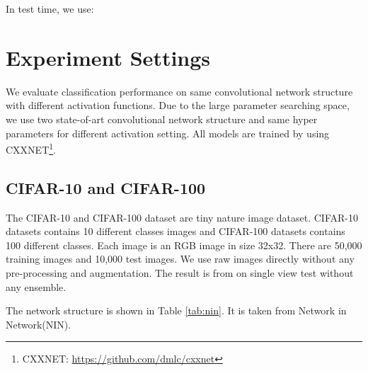 \documentclass{article}
\begin{document}
In test time, we use:



\section{Experiment Settings}
We evaluate classification performance on same convolutional network structure with different activation functions. Due to the large parameter searching space, we use two state-of-art convolutional network structure and same hyper parameters for different activation setting. All models are trained by using CXXNET\footnote{CXXNET: \url{https://github.com/dmlc/cxxnet}}.

\subsection{CIFAR-10 and CIFAR-100}
The CIFAR-10 and CIFAR-100 dataset \citep{krizhevsky2009learning} are tiny nature image dataset. CIFAR-10 datasets contains 10 different classes images and CIFAR-100 datasets contains 100 different classes. Each image is an RGB image in size 32x32. There are 50,000 training images and 10,000 test images. We use raw images directly without any pre-processing and augmentation. The result is from on single view test without any ensemble. 

The network structure is shown in Table \ref{tab:nin}. It is taken from Network in Network(NIN)\citep{lin2013network}.
\end{document}
